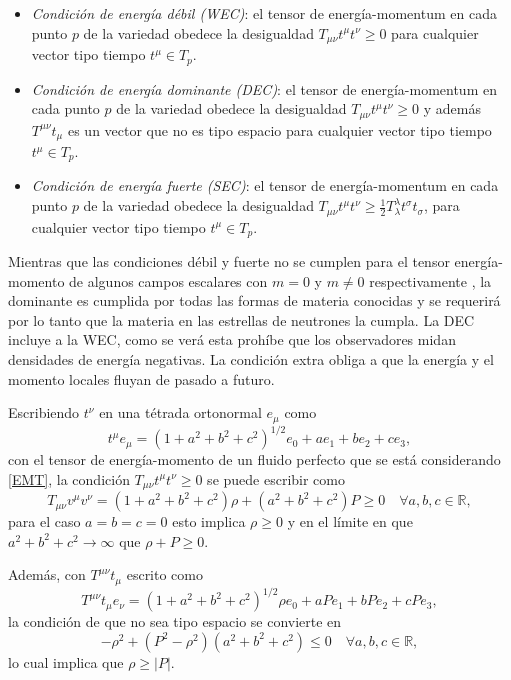 \begin{itemize}[leftmargin=1.5cm]
    \item \emph{Condición de energía débil (WEC)}: el tensor de energía-momentum en cada punto $p$ de la variedad obedece la desigualdad $T_{\mu \nu} t^{\mu} t^{\nu} \geq 0$ para cualquier vector tipo tiempo $t^{\mu}\in T_{p}$.
    \item \emph{Condición de energía dominante (DEC)}: el tensor de energía-momentum en cada punto $p$ de la variedad obedece la desigualdad $T_{\mu \nu} t^{\mu} t^{\nu} \geq 0$ y además $T^{\mu \nu} t_{\mu}$ es un vector que no es tipo espacio para cualquier vector tipo tiempo $t^{\mu}\in T_{p}$.
    \item \emph{Condición de energía fuerte (SEC)}: el tensor de energía-momentum en cada punto $p$ de la variedad obedece la desigualdad $T_{\mu \nu} t^{\mu} t^{\nu} \geq \frac{1}{2} T_{\lambda}^{\lambda} t^{\sigma} t_{\sigma}$, para cualquier vector tipo tiempo $t^{\mu}\in T_{p}$.
\end{itemize}
Mientras que las condiciones débil y fuerte no se cumplen para el tensor energía-momento de algunos campos escalares con $m=0$ y $m\neq 0$ respectivamente \cite{Hawking1973}, la dominante es cumplida por todas las formas de materia conocidas y se requerirá por lo tanto que la materia en las estrellas de neutrones la cumpla. La DEC incluye a la WEC, como se verá esta prohíbe que los observadores midan densidades de energía negativas. La condición extra obliga a que la energía y el momento locales fluyan de pasado a futuro.

Escribiendo $t^\nu$ en una tétrada ortonormal $e_{\mu}$ como
\begin{equation}
    t^{\mu} e_{\mu}= \left(1+a^{2}+b^{2}+c^{2}\right)^{1 / 2} e_{0}+a e_{1}+b e_{2}+c e_{3},
\end{equation}
con el tensor de energía-momento de un fluido perfecto que se está considerando \eqref{EMT}, la condición $T_{\mu \nu} t^{\mu} t^{\nu} \geq 0$ se puede escribir como
\begin{equation}
T_{\mu \nu} v^{\mu} v^{\nu}=\left(1+a^{2}+b^{2}+c^{2}\right) \rho + \left( a^{2} +b^{2} +c^{2} \right) P \geq 0 \quad \forall a,b,c \in \mathbb{R},
\end{equation}
para el caso $a=b=c=0$ esto implica $\rho \geq 0$ y en el límite en que $a^2+b^2+c^2 \to \infty$ que $\rho + P \geq 0$.

Además, con $T^{\mu \nu} t_{\mu}$ escrito como
\begin{equation}
T^{\mu \nu} t_{\mu}e_{\nu}=\left(1+a^{2}+b^{2}+c^{2}\right)^{1 / 2} \rho e_{0}+a P e_{1}+b P e_{2}+c P e_{3},
\end{equation}
la condición de que no sea tipo espacio se convierte en
\begin{equation}
    -\rho^2 + (P^2-\rho^2)(a^2+b^2+c^2) \leq 0 \quad \forall a,b,c \in \mathbb{R},
\end{equation}
lo cual implica que $\rho \geq |P|$.

